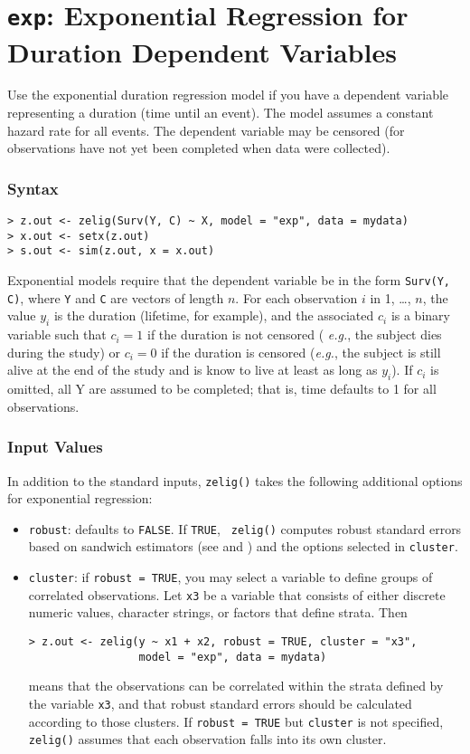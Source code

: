 \section{{\tt exp}: Exponential Regression for Duration Dependent Variables}\label{exp}

Use the exponential duration regression model if you have a dependent
variable representing a duration (time until an event).  The model
assumes a constant hazard rate for all events.  The dependent variable
may be censored (for observations have not yet been completed when
data were collected).

\subsubsection{Syntax}

\begin{verbatim}
> z.out <- zelig(Surv(Y, C) ~ X, model = "exp", data = mydata)
> x.out <- setx(z.out)
> s.out <- sim(z.out, x = x.out)
\end{verbatim}
Exponential models require that the dependent variable be in the form
{\tt Surv(Y, C)}, where {\tt Y} and {\tt C} are vectors of length $n$.
For each observation $i$ in 1, \dots, $n$, the value $y_i$ is the
duration (lifetime, for example), and the associated $c_i$ is a binary
variable such that $c_i = 1$ if the duration is not censored ({\it
  e.g.}, the subject dies during the study) or $c_i = 0$ if the
duration is censored ({\it e.g.}, the subject is still alive at the
end of the study and is know to live at least as long as $y_i$).  If
$c_i$ is omitted, all Y are assumed to be completed; that is, time
defaults to 1 for all observations.

\subsubsection{Input Values} 

In addition to the standard inputs, {\tt zelig()} takes the following
additional options for exponential regression:  
\begin{itemize}
\item {\tt robust}: defaults to {\tt FALSE}.  If {\tt TRUE}, {\tt
zelig()} computes robust standard errors based on sandwich estimators
(see \cite{Huber81} and \cite{White80}) and the options selected in
{\tt cluster}.
\item {\tt cluster}:  if {\tt robust = TRUE}, you may select a
variable to define groups of correlated observations.  Let {\tt x3} be
a variable that consists of either discrete numeric values, character
strings, or factors that define strata.  Then
\begin{verbatim}
> z.out <- zelig(y ~ x1 + x2, robust = TRUE, cluster = "x3", 
                 model = "exp", data = mydata)
\end{verbatim}
means that the observations can be correlated within the strata defined by
the variable {\tt x3}, and that robust standard errors should be
calculated according to those clusters.  If {\tt robust = TRUE} but
{\tt cluster} is not specified, {\tt zelig()} assumes that each
observation falls into its own cluster.  
\end{itemize}  


